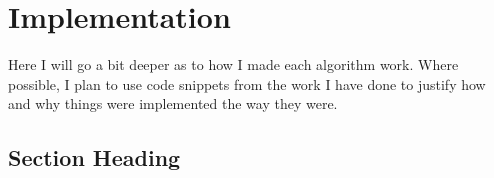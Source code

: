 \chapter{Implementation}


Here I will go a bit deeper as to how I made each algorithm work. Where possible, I plan to use code snippets from the work I have done to justify how and why things were implemented the way they were.

\section{Section Heading}
